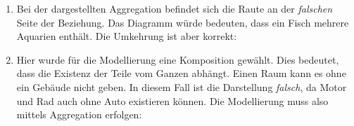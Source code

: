 \documentclass{lehramt-informatik-aufgabe}
\begin{document}
\begin{enumerate}
\item \strut


\begin{liAntwort}
Bei der dargestellten Aggregation befindet sich die Raute an der
\emph{falschen} Seite der Beziehung. Das Diagramm würde bedeuten, dass
ein Fisch mehrere Aquarien enthält. Die Umkehrung ist aber korrekt:

\end{liAntwort}

\item \strut


\begin{liAntwort}
Hier wurde für die Modellierung eine Komposition gewählt. Dies bedeutet,
dass die Existenz der Teile vom Ganzen abhängt. Einen Raum kann es \zB
ohne ein Gebäude nicht geben. In diesem Fall ist die Darstellung
\emph{falsch}, da Motor und Rad auch ohne Auto existieren können. Die
Modellierung muss also mittels Aggregation erfolgen:

\end{liAntwort}

\end{enumerate}
\end{document}
